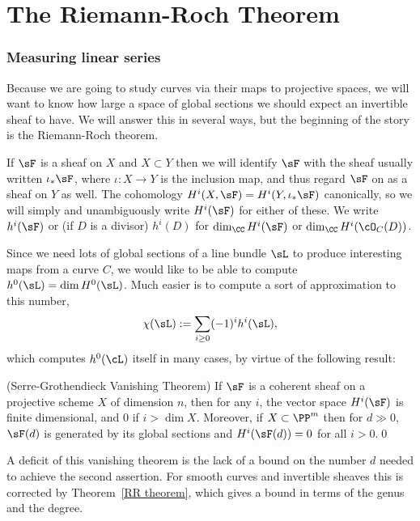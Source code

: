 

\chapter{The Riemann-Roch Theorem}\label{RiemannRochChapter}

\subsection{Measuring linear series}

Because we are going to study curves via their maps to projective spaces, we will want to know how large a space of global
sections we should expect an invertible sheaf to have. We will answer this in several ways, but the beginning
of the story is the Riemann-Roch theorem.

If $\sF$ is a sheaf on $X$ and $X\subset Y$ then we will identify $\sF$ with
the sheaf usually written $\iota_*\sF$, where $\iota:X\to Y$ is the inclusion map,
 and thus regard $\sF$ on as a sheaf on $Y$ as well.
The cohomology  $H^i(X, \sF) = H^i(Y,\iota_*\sF)$ canonically, so we will
simply and unambiguously write $H^i(\sF)$ for either of these. 
We write $h^i(\sF)$ or (if $D$ is a divisor) $h^{i}(D)$ for $\dim_{\CC}H^i(\sF)$ or $\dim_{\CC}H^i(\cO_C(D))$. 

Since we need lots of global sections of a line bundle $\sL$ to produce interesting maps from a curve $C$, we would like to be able to compute  $h^0(\sL) = \dim H^0(\sL)$. Much easier is to compute a sort of approximation to this number,
$$
\chi(\sL):= \sum_{i\geq 0} (-1)^i h^i(\sL),
$$
which computes $h^0(\cL)$ itself in many cases, by virtue of the following result:

\begin{theorem} (Serre-Grothendieck Vanishing Theorem)\label{Serre-Grothendieck vanishing}
If $\sF$ is a coherent sheaf on a projective scheme $X$ of dimension $n$, then for any $i$, the vector space $H^i(\sF)$ is finite dimensional, and 0 if  $i>\dim X$. Moreover,
if $X\subset \PP^m$ then for $d\gg 0$, $\sF(d)$ is generated by its global sections and $H^i(\sF(d)) = 0$ for all $i>0$.\qed
\end{theorem}

A deficit of this vanishing theorem is the lack of a bound on the number $d$ needed to achieve the second assertion. For smooth curves
and invertible sheaves
this is corrected by Theorem~\ref{RR theorem}, which gives a bound in terms of the genus and the degree.

